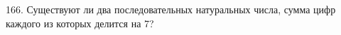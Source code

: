 166. Существуют ли два последовательных натуральных числа, сумма цифр каждого из которых делится на 7?\\

